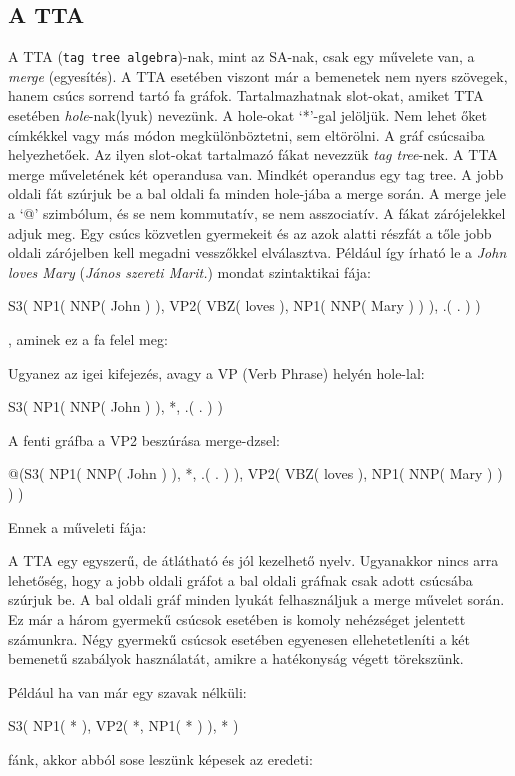 \subsection{A TTA}
\label{sec:tta}
A TTA (\texttt{tag tree algebra})-nak, mint az SA-nak, csak egy művelete van, a \textit{merge} (egyesítés). A TTA esetében viszont  már a bemenetek nem nyers szövegek, hanem csúcs sorrend tartó fa gráfok. Tartalmazhatnak slot-okat, amiket TTA esetében \textit{hole}-nak(lyuk) nevezünk. A hole-okat ‘*’-gal jelöljük. Nem lehet őket címkékkel vagy más módon megkülönböztetni, sem eltörölni. A gráf csúcsaiba helyezhetőek. Az ilyen slot-okat tartalmazó fákat nevezzük \textit{tag tree}-nek. A TTA merge műveletének két operandusa van. Mindkét operandus egy tag tree. A jobb oldali fát szúrjuk be a bal oldali fa minden hole-jába a merge során. A merge jele a ‘@’ szimbólum, és se nem kommutatív, se nem asszociatív. A fákat zárójelekkel adjuk meg. Egy csúcs közvetlen gyermekeit és az azok alatti részfát a tőle jobb oldali zárójelben kell megadni vesszőkkel elválasztva. Például így írható le a \textit{John loves Mary} (\textit{János szereti Marit.}) mondat szintaktikai fája:

S3( NP1( NNP( John ) ), VP2( VBZ( loves ),  NP1( NNP( Mary ) ) ), .( . ) )

, aminek ez a fa felel meg:

Ugyanez az igei kifejezés, avagy a VP (Verb Phrase) helyén hole-lal:

S3( NP1( NNP( John ) ), *, .( . ) )

A fenti gráfba a VP2 beszúrása merge-dzsel:

@(S3( NP1( NNP( John ) ), *, .( . ) ),  VP2( VBZ( loves ), NP1( NNP( Mary ) ) ) )

Ennek a műveleti fája:

A TTA egy egyszerű, de átlátható és jól kezelhető nyelv. Ugyanakkor nincs arra lehetőség, hogy a jobb oldali gráfot a bal oldali gráfnak csak adott csúcsába szúrjuk be. A bal oldali gráf minden lyukát felhasználjuk a merge művelet során. Ez már a három gyermekű csúcsok esetében is komoly nehézséget jelentett számunkra. Négy gyermekű csúcsok esetében egyenesen ellehetetleníti a két bemenetű szabályok használatát, amikre a hatékonyság végett törekszünk.

Például ha van már egy szavak nélküli:

S3( NP1( * ), VP2( *,  NP1( * ) ), * )

fánk, akkor abból sose leszünk képesek az eredeti:

